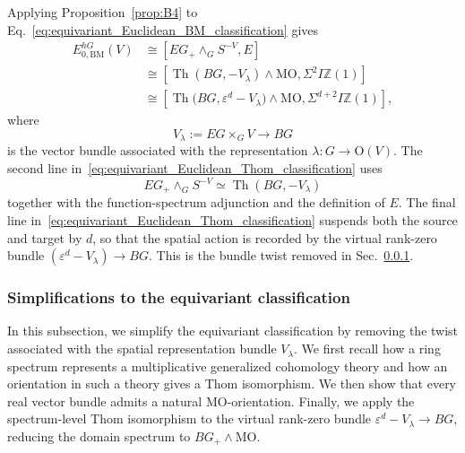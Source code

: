\documentclass[aps,prx,reprint,superscriptaddress,twocolumn,amsmath,amssymb,amsfonts, nofootinbib]{revtex4-2}
\theoremstyle{apsstyle}
\begin{document}
\noindent Applying Proposition~\ref{prop:B4} to
Eq.~\eqref{eq:equivariant_Euclidean_BM_classification} gives
\begin{equation}
\begin{aligned}
    E_{0,\mathrm{BM}}^{hG}(V)
    &\cong
    \left[
        EG_+\wedge_GS^{-V},
        E
    \right]\\
    &\cong
    \left[
        \operatorname{Th}(BG,-V_\lambda)\wedge\mathrm{MO},
        \Sigma^2I\mathbb Z(1)
    \right]\\
    &\cong
    \left[
        \operatorname{Th}
        \bigl(BG,\varepsilon^d-V_\lambda\bigr)
        \wedge\mathrm{MO},
        \Sigma^{d+2}I\mathbb Z(1)
    \right],
\end{aligned}
\label{eq:equivariant_Euclidean_Thom_classification}
\end{equation}
where
\begin{equation*}
    V_\lambda := EG\times_GV
    \longrightarrow BG
\end{equation*}
is the vector bundle associated with the representation $\lambda:G\to\mathrm O(V)$. The second line in~\eqref{eq:equivariant_Euclidean_Thom_classification} uses
\begin{equation*}
    EG_+\wedge_GS^{-V} \simeq \operatorname{Th}(BG,-V_\lambda)
\end{equation*}
together with the function-spectrum adjunction and the definition of $E$. The final line in~\eqref{eq:equivariant_Euclidean_Thom_classification} suspends both the source and target by $d$, so that the spatial action is recorded by the virtual rank-zero bundle $(\varepsilon^d-V_\lambda)\to BG$. This is the bundle twist removed in Sec.~\ref{app:cob_B5b}.

\subsubsection{Simplifications to the equivariant classification}
\label{app:cob_B5b}

In this subsection, we simplify the equivariant classification by
removing the twist associated with the spatial representation bundle $V_\lambda$.
We first recall how a ring spectrum represents a multiplicative
generalized cohomology theory and how an orientation in such a theory
gives a Thom isomorphism. We then show that every real vector bundle
admits a natural $\mathrm{MO}$-orientation. Finally, we apply the
spectrum-level Thom isomorphism to the virtual rank-zero bundle
$\varepsilon^d-V_\lambda\to BG$, reducing the domain spectrum to
$BG_+\wedge\mathrm{MO}$.
\end{document}
